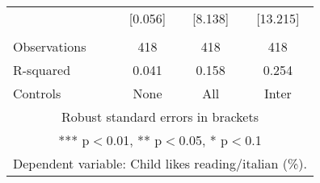 \begin{tabular}{lccc}
 & [0.056] & [8.138] & [13.215] \\
 &  &  &  \\
Observations & 418 & 418 & 418 \\
R-squared & 0.041 & 0.158 & 0.254 \\
 Controls & None & All & Inter \\ \hline
\multicolumn{4}{c}{ Robust standard errors in brackets} \\
\multicolumn{4}{c}{ *** p$<$0.01, ** p$<$0.05, * p$<$0.1} \\
\multicolumn{4}{c}{ Dependent variable: Child likes reading/italian (\%).} \\
\end{tabular}
